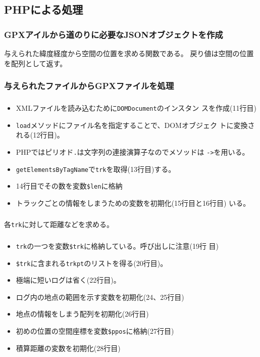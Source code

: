   \subsection{PHPによる処理}
\begin{frame}[containsverbatim]
 \frametitle{GPXアイルから道のりに必要なJSONオブジェクトを作成}
 与えられた緯度経度から空間の位置を求める関数である。
 戻り値は空間の位置を配列として返す。
\end{frame}
\begin{frame}[containsverbatim]
 \frametitle{与えられたファイルからGPXファイルを処理}
\end{frame}
\begin{frame}[containsverbatim]
 \frametitle{}
 \begin{itemize}
  \item XMLファイルを読み込むために\texttt{DOMDocument}のインスタン
        スを作成(11行目)
  \item \texttt{load}メソッドにファイル名を指定することで、DOMオブジェク
        トに変換される(12行目)。
  \item PHPではピリオド\texttt{.}は文字列の連接演算子なのでメソッドは
        \texttt{->}を用いる。
  \item \texttt{getElementsByTagName}で\texttt{trk}を取得(13行目)する。
  \item 14行目でその数を変数\texttt{\$len}に格納
  \item トラックごとの情報をしまうための変数を初期化(15行目と16行目)
				いる。
 \end{itemize}
\end{frame}
\begin{frame}[containsverbatim]
 \frametitle{}
 各\texttt{trk}に対して距離などを求める。
\end{frame}
\begin{frame}[containsverbatim]
 \frametitle{}
 \begin{itemize}
  \item \texttt{trk}の一つを変数\texttt{\$trk}に格納している。呼び出しに注意(19行
        目)
  \item \texttt{\$trk}に含まれる\texttt{trkpt}のリストを得る(20行目)。
  \item 極端に短いログは省く(22行目)。
  \item ログ内の地点の範囲を示す変数を初期化(24、25行目)
  \item 地点の情報をしまう配列を初期化(26行目)
  \item 初めの位置の空間座標を変数\texttt{\$ppos}に格納(27行目)
  \item 積算距離の変数を初期化(28行目)
 \end{itemize}
\end{frame}
